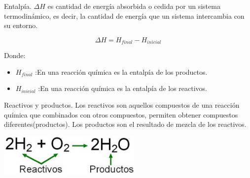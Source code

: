 \begin{frame}[c]{Entalpía.}
 $\Delta H$ es cantidad de energía absorbida o cedida por un sistema termodinámico, es decir, la cantidad de energía que un sistema intercambia con su entorno.
    \begin{center}
        \begin{equation}
            \Delta H = H_{final} - H_{inicial}
        \end{equation}
    \end{center}
    Donde:
    \begin{itemize}
      \item $H_{final}$ :En una reacción química es la entalpía de los productos.
      \item $H_{inicial}$ :En una reacción química es la entalpía de los reactivos.
    \end{itemize}
\end{frame}
\begin{frame}[c]{Reactivos y productos.}
Los reactivos son aquellos compuestos de una reacción química que combinados con otros compuestos, permiten obtener compuestos diferentes(productos). Los productos son el resultado de mezcla de los reactivos.
\begin{center}
\includegraphics[width=7cm]{./graphics/reactivos-productos.jpg}
\end{center}
\end{frame}

